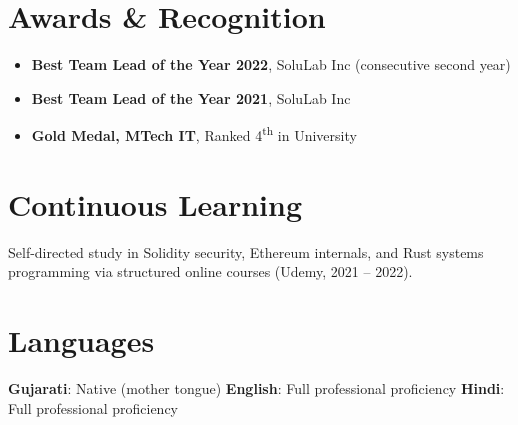 \documentclass[11pt, a4paper]{article}
\begin{document}
\section{Awards \& Recognition}

\begin{itemize}
  \item \textbf{Best Team Lead of the Year 2022}, SoluLab Inc (consecutive second year)
  \item \textbf{Best Team Lead of the Year 2021}, SoluLab Inc
  \item \textbf{Gold Medal, MTech IT}, Ranked 4\textsuperscript{th} in University
\end{itemize}

\section{Continuous Learning}

\noindent
Self-directed study in Solidity security, Ethereum internals, and Rust systems programming via structured online courses (Udemy, 2021 – 2022).

\section{Languages}

\noindent
\textbf{Gujarati}: Native (mother tongue)\quad\textbullet\quad
\textbf{English}: Full professional proficiency\quad\textbullet\quad
\textbf{Hindi}: Full professional proficiency
\end{document}

